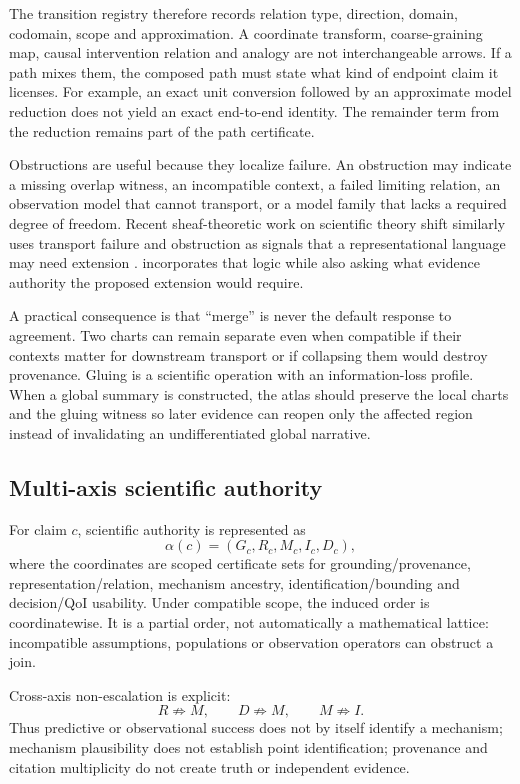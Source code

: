 The transition registry therefore records relation type, direction, domain, codomain, scope and approximation. A coordinate transform, coarse-graining map, causal intervention relation and analogy are not interchangeable arrows. If a path mixes them, the composed path must state what kind of endpoint claim it licenses. For example, an exact unit conversion followed by an approximate model reduction does not yield an exact end-to-end identity. The remainder term from the reduction remains part of the path certificate.

Obstructions are useful because they localize failure. An obstruction may indicate a missing overlap witness, an incompatible context, a failed limiting relation, an observation model that cannot transport, or a model family that lacks a required degree of freedom. Recent sheaf-theoretic work on scientific theory shift similarly uses transport failure and obstruction as signals that a representational language may need extension \cite{olivieri2026sheaf}. \RAKL{} incorporates that logic while also asking what evidence authority the proposed extension would require.

A practical consequence is that ``merge'' is never the default response to agreement. Two charts can remain separate even when compatible if their contexts matter for downstream transport or if collapsing them would destroy provenance. Gluing is a scientific operation with an information-loss profile. When a global summary is constructed, the atlas should preserve the local charts and the gluing witness so later evidence can reopen only the affected region instead of invalidating an undifferentiated global narrative.

\subsection{Multi-axis scientific authority}
For claim $c$, scientific authority is represented as
\begin{equation}\alpha(c)=(G_c,R_c,M_c,I_c,D_c),\end{equation}
where the coordinates are scoped certificate sets for grounding/provenance, representation/relation, mechanism ancestry, identification/bounding and decision/QoI usability. Under compatible scope, the induced order is coordinatewise. It is a partial order, not automatically a mathematical lattice: incompatible assumptions, populations or observation operators can obstruct a join.

Cross-axis non-escalation is explicit:
\begin{equation}R\not\Rightarrow M,\qquad D\not\Rightarrow M,\qquad M\not\Rightarrow I.\end{equation}
Thus predictive or observational success does not by itself identify a mechanism; mechanism plausibility does not establish point identification; provenance and citation multiplicity do not create truth or independent evidence.
